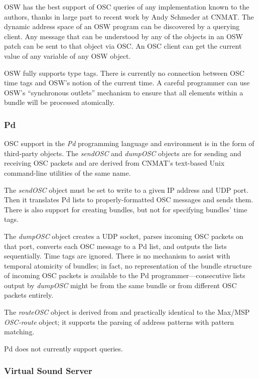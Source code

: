 OSW has the best support of OSC queries of any implementation known to the
authors, thanks in large part to recent work by Andy Schmeder at CNMAT.  The
dynamic address space of an OSW program can be discovered by a querying client.
Any message that can be understood by any of the objects in an OSW patch can be
sent to that object via OSC.  An OSC client can get the current value of any
variable of any OSW object.

OSW fully supports type tags.  There is currently no connection between OSC time
tags and OSW's notion of the current time.  A careful programmer can use OSW's
``synchronous outlets'' mechanism to ensure that all elements within a bundle
will be processed atomically.

\subsubsection{Pd}

OSC support in the \textit{Pd} programming language and environment \cite{Puckette:1996} is in
the form of third-party objects.  The \textit{sendOSC} and \textit{dumpOSC}
objects are for sending and receiving OSC packets and are derived from CNMAT's
text-based Unix command-line utilities of the same name.

The \textit{sendOSC} object must be set to write to a given IP address and UDP
port.  Then it translates Pd lists to properly-formatted OSC messages and sends
them.  There is also support for creating bundles, but not for specifying
bundles' time tags.

The \textit{dumpOSC} object creates a UDP socket, parses incoming OSC packets on
that port, converts each OSC message to a Pd list, and outputs the lists
sequentially.  Time tags are ignored.  There is no mechanism to assist with
temporal atomicity of bundles; in fact, no representation of the bundle structure
of incoming OSC packets is available to the Pd programmer---consecutive lists
output by \textit{dumpOSC} might be from the same bundle or from different OSC
packets entirely.

The \textit{routeOSC} object is derived from and practically identical to the
Max/MSP \textit{OSC-route} object; it supports the parsing of address patterns
with pattern matching.

Pd does not currently support queries.

\subsubsection{Virtual Sound Server}

